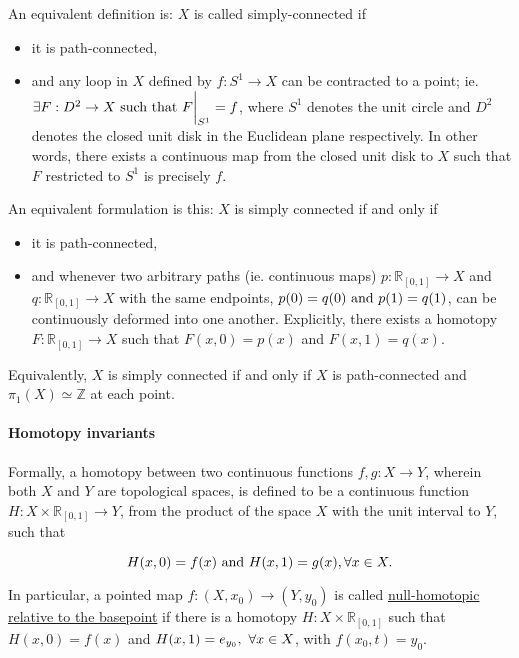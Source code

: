 \documentclass{homework}
\begin{document}
An equivalent definition is: $X$ is called simply-connected if

\begin{itemize}
    \item it is path-connected, 
    \item and any loop in $X$ defined by $f: S^{1} \to X$ can be contracted to a point; ie. $\exists F: D^{2} \to X \textnormal{ such that } F\bigg|_{S^{1}} = f$, where ${S^{1}}$ denotes the unit circle and $D^2$ denotes the closed unit disk in the Euclidean plane respectively. In other words, there exists a continuous map from the closed unit disk to $X$ such that $F$ restricted to $S^1$ is precisely $f$.
\end{itemize}

An equivalent formulation is this: $X$ is simply connected if and only if 

\begin{itemize}
    \item it is path-connected,
    \item and whenever two arbitrary paths (ie. continuous maps) $p: \mathds{R}_{[0,1]} \to X$ and $q: \mathds{R}_{[0,1]} \to X$ with the same endpoints, $p(0) = q(0) \textnormal{ and } p(1) = q(1)$, can be continuously deformed into one another. Explicitly, there exists a homotopy $F: \mathds{R}_{[0,1]} \to X$ such that $F(x,0) = p(x)$ and $F(x,1) = q(x)$. \\
\end{itemize}

Equivalently, $X$ is simply connected if and only if $X$ is path-connected and $\pi_1 (X) \simeq \mathds{Z}$ at each point. \\

\paragraph{\textbf{Homotopy invariants}}

Formally, a homotopy between two continuous functions $f, g: X \to Y$, wherein both $X$ and $Y$ are topological spaces, is defined to be a continuous function $H: X \times \mathds{R}_{[0,1]} \to Y$, from the product of the space $X$ with the unit interval to $Y$, such that 

$$
    H(x,0) = f(x) \textnormal{ and } H(x, 1) = g(x), \forall x \in X.
$$

In particular, a pointed map $f: (X, x_0) \rightarrow (Y, y_0)$ is called \underline{null-homotopic relative to the basepoint} if there is a homotopy $H: X\times \mathds{R}_{[0,1]}$ such that $H(x,0) = f(x)$ and $H(x, 1) = e_{y_0}, \textnormal{ } \forall x \in X$, with $f(x_0, t) = y_0$.
\end{document}
